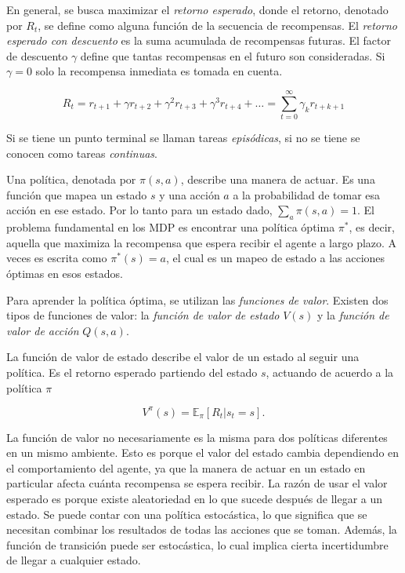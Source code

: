 En general, se busca maximizar el \textit{retorno
esperado}, donde el retorno, denotado por $R_t$, se define como alguna función de la secuencia de recompensas. 
El \textit{retorno esperado con descuento} es la suma acumulada de recompensas futuras. El factor de descuento $\gamma$
define que tantas recompensas en el 
futuro son consideradas. Si $\gamma = 0$
solo la recompensa inmediata es
tomada en cuenta.

\[
R_t = r_{t+1} + \gamma r_{t+2} + \gamma^2 r_{t+3} + \gamma^3 r_{t+4} + \dots = 
\sum_{t = 0}^\infty \gamma_{k} r_{t+k+1}
\]

Si se tiene un punto terminal se llaman tareas \textit{episódicas}, si no se tiene se conocen como tareas \textit{continuas}.


Una política, denotada por $\pi(s, a)$, describe una manera de actuar. Es una función que mapea un estado $s$ y una acción $a$ a la probabilidad de tomar esa acción en ese estado.
Por lo tanto para un estado dado, 
$\sum_a \pi (s, a) = 1$. El problema fundamental en los MDP es encontrar una política óptima $\pi^*$, es decir, aquella que maximiza la recompensa que espera recibir el agente a largo plazo.
A veces es escrita como $\pi^*(s) = a$, el cual es un mapeo de estado a las acciones óptimas en esos estados.

Para aprender la política óptima, se utilizan las \textit{funciones de valor}. Existen dos tipos de funciones de valor: la \textit{ función de valor de estado} $V(s)$ y la \textit{función de valor de acción} $Q(s, a)$.

La función de valor de estado describe el valor de un estado al seguir una política. Es el retorno esperado partiendo del estado $s$, actuando de acuerdo
a la política $\pi$

\begin{equation}\label{eq:state-value-func}
V^\pi(s) = \mathbb{E}_\pi[R_t | s_t = s].    
\end{equation}


La función de valor no necesariamente es la misma para dos políticas diferentes
en un mismo ambiente. Esto es porque el valor del estado
cambia dependiendo en el comportamiento del agente, ya que la manera de actuar
en un estado en particular afecta cuánta recompensa se espera recibir.
La razón de usar el valor esperado  es porque existe aleatoriedad en lo que
sucede después de llegar a un estado. Se puede contar con una política estocástica, lo que significa que se necesitan combinar los resultados de 
todas las acciones que se toman. Además, la función de transición puede ser estocástica, lo cual implica cierta incertidumbre de llegar a cualquier 
estado.

